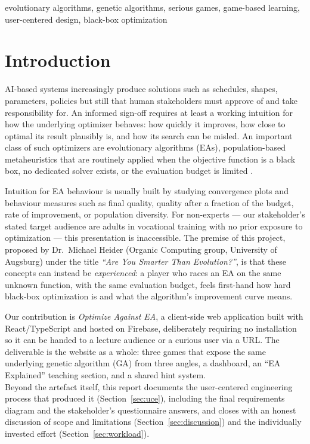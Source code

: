 \documentclass[conference]{IEEEtran}
\begin{document}
\begin{IEEEkeywords}
evolutionary algorithms, genetic algorithms, serious games, game-based learning, user-centered design, black-box optimization
\end{IEEEkeywords}

\section{Introduction}
AI-based systems increasingly produce solutions such as schedules, shapes, parameters, policies but still that human stakeholders must approve of and take responsibility for. An informed sign-off requires at least a working intuition for how the underlying optimizer behaves: how quickly it improves, how close to optimal its result plausibly is, and how its search can be misled. An important class of such optimizers are evolutionary algorithms (EAs), population-based metaheuristics that are routinely applied when the objective function is a black box, no dedicated solver exists, or the evaluation budget is limited \cite{eiben2015,holland1992}.

Intuition for EA behaviour is usually built by studying convergence plots and behaviour measures such as final quality, quality after a fraction of the budget, rate of improvement, or population diversity. For non-experts --- our stakeholder's stated target audience are adults in vocational training with no prior exposure to optimization --- this presentation is inaccessible. The premise of this project, proposed by Dr.\ Michael Heider (Organic Computing group, University of Augsburg) under the title \emph{``Are You Smarter Than Evolution?''}, is that these concepts can instead be \emph{experienced}: a player who races an EA on the same unknown function, with the same evaluation budget, feels first-hand how hard black-box optimization is and what the algorithm's improvement curve means.

Our contribution is \emph{Optimize Against EA}, a client-side web application built with React/TypeScript and hosted on Firebase, deliberately requiring no installation so it can be handed to a lecture audience or a curious user via a URL. The deliverable is the website as a whole: three games that expose the same underlying genetic algorithm (GA) from three angles, a dashboard, an ``EA Explained'' teaching section, and a shared hint system.\\
Beyond the artefact itself, this report documents the user-centered engineering process that produced it (Section~\ref{sec:uce}), including the final requirements diagram and the stakeholder's questionnaire answers, and closes with an honest discussion of scope and limitations (Section~\ref{sec:discussion}) and the individually invested effort (Section~\ref{sec:workload}).
\end{document}
